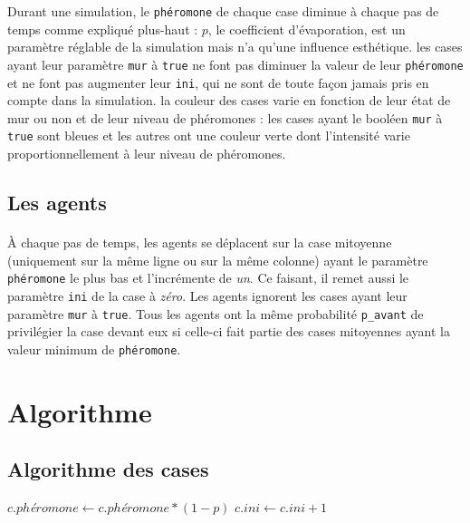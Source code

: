 \documentclass{article}
\begin{document}
        Durant une simulation, le \texttt{phéromone} de chaque case diminue à chaque pas de temps comme expliqué plus-haut : $p$, le coefficient
        d'évaporation, est un paramètre réglable de la simulation mais n'a qu'une influence esthétique. les cases ayant leur paramètre \texttt{mur}
        à \texttt{true} ne font pas diminuer la valeur de leur \texttt{phéromone} et ne font pas augmenter leur \texttt{ini}, qui ne sont de toute façon jamais pris en compte dans la simulation.
        la couleur des cases varie en fonction de leur état de mur ou non et de leur niveau de phéromones : les cases
        ayant le booléen \texttt{mur} à \texttt{true} sont bleues et les autres ont une couleur verte dont l'intensité varie proportionnellement à leur
        niveau de phéromones.
    \subsection{Les agents}
        \paragraph{}À chaque pas de temps, les agents se déplacent sur la case mitoyenne (uniquement sur la même ligne ou sur la même colonne) 
        ayant le paramètre \texttt{phéromone} le plus bas et l'incrémente de \textit{un}. Ce faisant, il remet aussi le paramètre \texttt{ini} 
        de la case à \textit{zéro}. Les agents ignorent les cases ayant leur paramètre \texttt{mur} à \texttt{true}. Tous les agents ont la 
        même probabilité \texttt{p\_avant} de privilégier la case devant eux si celle-ci fait partie des cases mitoyennes ayant la valeur minimum
        de \texttt{phéromone}.
\section{Algorithme}
    \subsection{Algorithme des cases}
    \begin{algorithmic}
            \STATE $c.ph$\textit{é}$romone \gets c.ph$\textit{é}$romone  * (1-p)$
            \STATE $c.ini \gets c.ini+1$
        \ENDIF 
        \ENDFOR
        \end{algorithmic}
\end{document}
